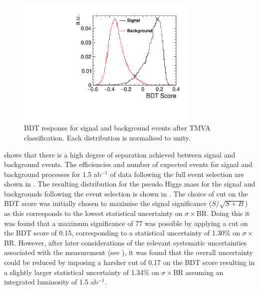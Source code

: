 \begin{figure}
  \centering
  \includegraphics[width=0.78\textwidth,keepaspectratio]{HiggsAnalysis/figures/bdtscore}
  \caption[Classifier BDT response]{BDT response for signal and background events after TMVA classification. Each distribution is normalised to unity.}
  \label{bdt}
\end{figure}

 shows that there is a high degree of separation achieved between signal and background events. The efficiencies and number of expected events for signal and background processes for 1.5 ab$^{-1}$ of data following the full event selection are shown in . The resulting distribution for the pseudo Higgs mass for the signal and backgrounds following the event selection is shown in . The choice of cut on the BDT score was initially chosen to maximise the signal significance ($S/\sqrt{S+B}$) as this corresponds to the lowest statistical uncertainty on $\sigma\times$BR. Doing this it was found that a maximum significance of 77 was possible by applying a cut on the BDT score of 0.15, corresponding to a statistical uncertainty of 1.30\% on $\sigma\times$BR. However, after later considerations of the relevant systematic uncertainties associated with the measurement (see ), it was found that the overall uncertainty could be reduced by imposing a harsher cut of 0.17 on the BDT score resulting in a slightly larger statistical uncertainty of 1.34\% on $\sigma\times$BR assuming an integrated luminosity of 1.5 ab$^{-1}$.

